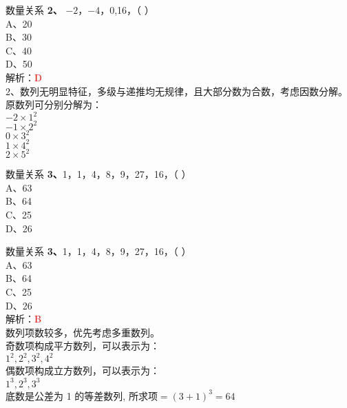 \documentclass[aspectratio=169]{beamer}
\begin{document}
\begin{frame}[t]{数量关系}
    \textbf{2、} $-2$，$-4$，0,16，（ ）\\
    A、20\\
    B、30\\
    C、40\\
    D、50\\
    解析：\textcolor{red}{D}\\
    2、数列无明显特征，多级与递推均无规律，且大部分数为合数，考虑因数分解。原数列可分别分解为：\\
    $-2 \times 1^2$\\
    $-1 \times 2^2$\\
    $0 \times 3^2$\\
    $1 \times 4^2$\\
    $2 \times 5^2$\\
\end{frame}



\begin{frame}[t]{数量关系}
    \textbf{3、}1，1，4，8，9，27，16，（ ）\\
    A、63\\
    B、64\\
    C、25\\
    D、26\\
\end{frame}


\begin{frame}[t]{数量关系}
    \textbf{3、}1，1，4，8，9，27，16，（ ）\\
    A、63\\
    B、64\\
    C、25\\
    D、26\\
    解析：\textcolor{red}{B}\\
    数列项数较多，优先考虑多重数列。\\
    奇数项构成平方数列，可以表示为：\\
    $1^2, 2^2, 3^2, 4^2$\\
    偶数项构成立方数列，可以表示为：\\
    $1^3, 2^3, 3^3$\\
    底数是公差为 1 的等差数列, 所求项$=(3+1)^3 = 64$\\
\end{frame}
\end{document}
